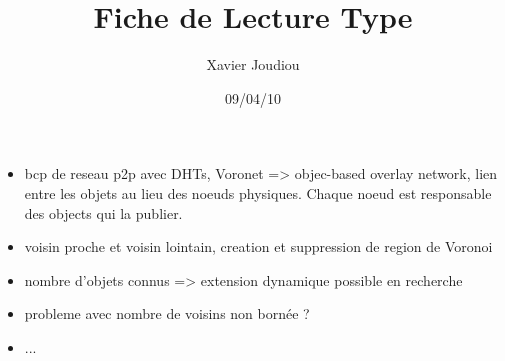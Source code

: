 \documentclass[11pt,a4paper]{article}
\title{Fiche de Lecture Type}
\author{Xavier Joudiou}
\date{09/04/10}
\begin{document}
	
  \begin{itemize}
  \renewcommand{\labelitemi}{$\Rightarrow$}
	\item bcp de reseau p2p avec DHTs, Voronet => objec-based overlay network, lien entre les objets au lieu des noeuds physiques. Chaque noeud est responsable des objects qui la publier.
	\item voisin proche et voisin lointain, creation et suppression de region de Voronoi
	\item nombre d'objets connus => extension dynamique possible en recherche
	\item probleme avec nombre de voisins non bornée ? 
	\item ...
  \end{itemize}
\end{document}
